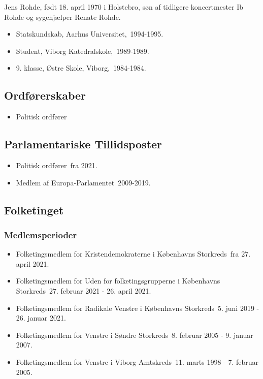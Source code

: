 \documentclass[11pt, a4paper]{awesome-cv}
\begin{document}
\makecvheader[R]
\makelettertitle
\begin{cvletter}
Jens Rohde, født 18. april 1970 i Holstebro, søn af tidligere koncertmester Ib Rohde og sygehjælper Renate Rohde.

\begin{itemize}
\item Statskundskab, Aarhus Universitet, 1994-1995.
\item Student, Viborg Katedralskole, 1989-1989.
\item 9. klasse, Østre Skole, Viborg, 1984-1984.
\end{itemize}
\subsection*{Ordførerskaber}
\begin{itemize}
\item Politisk ordfører
\end{itemize}
\subsection*{Parlamentariske Tillidsposter}
\begin{itemize}
\item Politisk ordfører fra 2021.
\item Medlem af Europa-Parlamentet 2009-2019.
\end{itemize}
\subsection*{Folketinget}
\subsubsection*{Medlemsperioder}
\begin{itemize}
\item Folketingsmedlem for Kristendemokraterne i Københavns Storkreds fra 27. april 2021.
\item Folketingsmedlem for Uden for folketingsgrupperne i Københavns Storkreds 27. februar 2021 - 26. april 2021.
\item Folketingsmedlem for Radikale Venstre i Københavns Storkreds 5. juni 2019 - 26. januar 2021.
\item Folketingsmedlem for Venstre i Søndre Storkreds 8. februar 2005 - 9. januar 2007.
\item Folketingsmedlem for Venstre i Viborg Amtskreds 11. marts 1998 - 7. februar 2005.
\end{itemize}

\end{cvletter}
\end{document}
